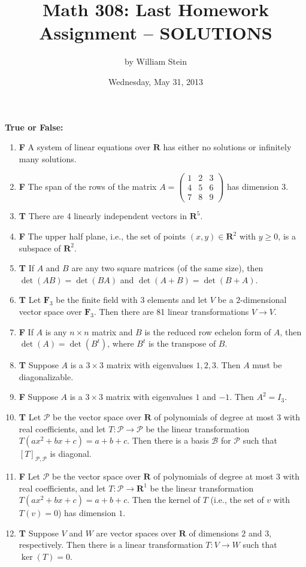 \documentclass[10pt]{article}
\title{\color{blue}\bf Math 308: Last Homework Assignment -- SOLUTIONS}
\date{Wednesday, May 31, 2013}
\author{by William Stein}
\newcommand{\tf}[2]{\item {\bf {\color{blue}\hspace{1em}#1}}\hspace{1em} #2}
\newcommand{\R}{\mathbf{R}}
\newcommand{\F}{\mathbf{F}}
\renewcommand{\P}{\mathcal{P}}
\begin{document}
\maketitle

{\noindent\bf \color{red} True or False:}
\begin{enumerate}

\tf{F}{A system of linear equations over $\R$ has either no solutions or infinitely many solutions.}

\tf{F}{The span of the rows of the matrix $A=\left(\begin{array}{rrr}
1 & 2 & 3 \\
4 & 5 & 6 \\
7 & 8 & 9
\end{array}\right)$ has dimension 3.}

\tf{T}{There are 4 linearly independent vectors in $\R^5$.}

\tf{F}{The upper half plane, i.e., the set of points $(x,y) \in \R^2$ with $y\geq 0$, is a subspace of $\R^2$.}

\tf{T}{If $A$ and $B$ are any two square matrices (of the same size), then $\det(AB)=\det(BA)$ and $\det(A+B)=\det(B+A)$.}

\tf{T}{Let $\F_3$ be the finite field with $3$ elements and let $V$ be a $2$-dimensional
    vector space over $\F_3$.  Then there are 81 linear transformations $V\to V$.}

\tf{F}{If $A$ is any $n\times n$ matrix and $B$ is the reduced row echelon form of $A$, then $\det(A)=\det(B^t)$, where
$B^t$ is the transpose of $B$.}

\tf{T}{Suppose $A$ is a $3 \times 3$ matrix with eigenvalues $1,2,3$. Then $A$ must be diagonalizable.}

\tf{F}{Suppose $A$ is a $3 \times 3$ matrix with eigenvalues $1$ and $-1$.  Then $A^2=I_3$.}

\tf{T}{Let $\P$ be the vector space over $\R$ of polynomials of degree at most $3$ with real coefficients,
and let $T:\P\to\P$ be the linear transformation $T(ax^2+bx+c)=a+b+c$.  Then there is a basis $\mathcal{B}$
for $\P$ such that $[T]_{\P,\P}$ is diagonal.}

\tf{F}{Let $\P$ be the vector space over $\R$ of polynomials of degree at most $3$ with real coefficients,
and let $T:\P\to\R^1$ be the linear transformation $T(ax^2+bx+c)=a+b+c$.
Then the kernel of $T$ (i.e., the set of $v$ with $T(v)=0$) has dimension $1$.}

\tf{T}{Suppose $V$ and $W$ are vector spaces over $\R$ of dimensions $2$ and $3$, respectively.
Then there is a linear transformation $T:V\to W$ such that $\ker(T)=0$.}


\end{enumerate}
\end{document}
